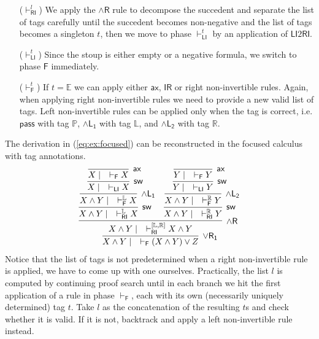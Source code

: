 \documentclass[submission,copyright,creativecommons]{eptcs}
\theoremstyle{definition}
\newcommand{\pass}{\mathsf{pass}}
\newcommand{\unitr}{\mathsf{IR}}
\newcommand{\andlone}{\land \mathsf{L_{1}}}
\newcommand{\andltwo}{\land \mathsf{L_{2}}}
\newcommand{\andli}{\land \mathsf{L}_{i}}
\newcommand{\andr}{\land \mathsf{R}}
\newcommand{\orrone}{\lor \mathsf{R_{1}}}
\newcommand{\ax}{\mathsf{ax}}
\newcommand{\RI}{\mathsf{RI}}
\newcommand{\LI}{\mathsf{LI}}
\newcommand{\Pass}{\mathsf{P}}
\newcommand{\F}{\mathsf{F}}
\newcommand{\sw}{\mathsf{sw}}
\newcommand{\tP}{\mathbb{P}}
\newcommand{\tL}{\mathbb{L}}
\newcommand{\tR}{\mathbb{R}}
\newcommand{\tE}{\mathbb{E}}
\begin{document}
\begin{itemize}
  \item[($\vdash^{l}_{\RI}$)] We apply the $\andr$ rule to decompose the succedent and separate the list of tags carefully until the succedent becomes non-negative and the list of tags becomes a singleton $t$, then we move to phase $\vdash_\LI^t$ by an application of $\LI2 \RI$.
  \item[($\vdash^{t}_{\LI}$)] Since the stoup is either empty or a negative formula, we switch to phase $\F$ immediately.
  \item[($\vdash^{t}_{\F}$)] If $t = \tE$ we can apply either $\ax$, $\unitr$ or right non-invertible rules. Again, when applying right non-invertible rules we need to provide a new valid list of tags.
  Left non-invertible rules can be applied only when the tag is correct, i.e. $\pass$ with tag $\tP$, $\andlone$ with tag $\tL$, and $\andltwo$ with tag $\tR$.
\end{itemize}
The derivation in (\ref{eq:ex:focused}) can be reconstructed in the focused calculus with tag annotations.
\begin{equation}\label{eq:ex:tag:focused}
  \begin{array}{c}
  \infer[\orrone]{X \land Y \mid \quad \vdash_{\F} (X \land Y) \lor Z}{
    \infer[\andr]{X \land Y \mid \quad \vdash^{[ \tL , \tR ]}_{\RI} X \land Y}{
      \infer[\sw]{X \land Y \mid \quad \vdash^{\tL}_{\RI} X}{
        \infer[\andlone]{X \land Y \mid \quad \vdash^{\tL}_{\F} X}{
          \infer[\sw]{X \mid \quad \vdash_{\LI} X}{
            \infer[\ax]{X \mid \quad \vdash_{\F} X}{}
          }
        }
      }
      &
      \infer[\sw]{X \land Y \mid \quad \vdash^{\tR}_{\RI} Y}{
        \infer[\andltwo]{X \land Y \mid \quad \vdash^{\tR}_{\F} Y}{
          \infer[\sw]{Y \mid \quad \vdash_{\LI} Y}{
            \infer[\ax]{Y \mid \quad \vdash_{\F} Y}{}
          }
        }
      }
    }
  }
  \end{array}
\end{equation}
Notice that the list of tags is not predetermined when a right non-invertible rule is applied, we have to come up with one ourselves.
Practically, the list $l$ is computed by continuing proof search until in each branch we hit the first application of a rule in phase $\vdash_\F$, each with its own (necessarily uniquely determined) tag $t$. Take $l$ as the concatenation of the resulting $t$s and check whether it is valid. If it is not, backtrack and apply a left non-invertible rule instead.
\end{document}
